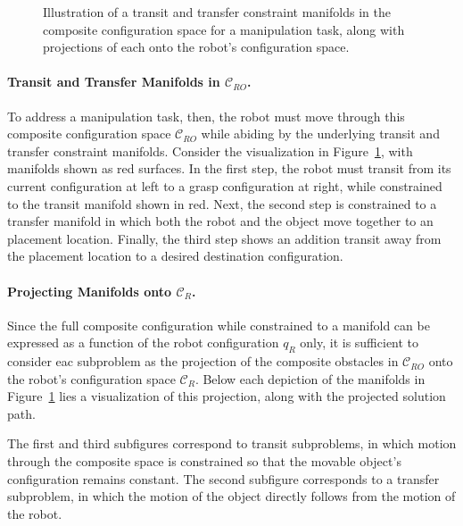 \begin{figure}
   \centering
   \caption{Illustration of a transit and transfer constraint manifolds
      in the composite configuration space for a manipulation task,
      along with projections of each
      onto the robot's configuration space.}
   \label{fig:family:composite-manifolds}
\end{figure}

\paragraph{Transit and Transfer Manifolds in $\mathcal{C}_{RO}$.}
To address a manipulation task, then,
the robot must move through this composite configuration space
$\mathcal{C}_{RO}$
while abiding by the underlying transit and transfer constraint
manifolds.
Consider the visualization
in Figure~\ref{fig:family:composite-manifolds},
with manifolds shown as red surfaces.
In the first step,
the robot must transit from its current configuration at left
to a grasp configuration at right,
while constrained to the transit manifold shown in red.
Next,
the second step is constrained to a transfer manifold
in which both the robot and the object move together
to an placement location.
Finally, the third step shows an addition transit away from
the placement location to a desired destination configuration.

\paragraph{Projecting Manifolds onto $\mathcal{C}_{R}$.}
Since the full composite configuration while constrained to a manifold
can be expressed as a function of the robot configuration $q_R$ only,
it is sufficient to consider eac subproblem as the projection of
the composite obstacles in $\mathcal{C}_{RO}$
onto the robot's configuration space $\mathcal{C}_{R}$.
Below each depiction of the manifolds
in Figure~\ref{fig:family:composite-manifolds}
lies a visualization of this projection,
along with the projected solution path.

The first and third subfigures correspond to transit subproblems,
in which motion through the composite space is constrained so that
the movable object's configuration remains constant.
The second subfigure corresponds to a transfer subproblem,
in which the motion of the object directly follows from the
motion of the robot.

